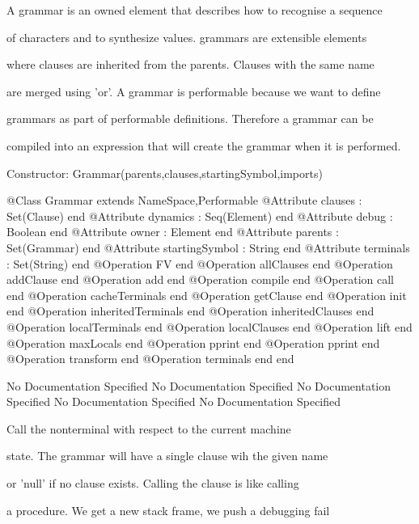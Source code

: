      A grammar is an owned element that describes how to recognise a sequence

     of characters and to synthesize values. grammars are extensible elements

     where clauses are inherited from the parents. Clauses with the same name

     are merged using 'or'. A grammar is performable because we want to define

     grammars as part of performable definitions. Therefore a grammar can be

     compiled into an expression that will create the grammar when it is performed.
     
     Constructor: Grammar(parents,clauses,startingSymbol,imports)
\begin{Interface}
@Class Grammar extends NameSpace,Performable
  @Attribute clauses : Set(Clause) end
  @Attribute dynamics : Seq(Element) end
  @Attribute debug : Boolean end
  @Attribute owner : Element end
  @Attribute parents : Set(Grammar) end
  @Attribute startingSymbol : String end
  @Attribute terminals : Set(String) end
  @Operation FV end
  @Operation allClauses end
  @Operation addClause end
  @Operation add end
  @Operation compile end
  @Operation call end
  @Operation cacheTerminals end
  @Operation getClause end
  @Operation init end
  @Operation inheritedTerminals end
  @Operation inheritedClauses end
  @Operation localTerminals end
  @Operation localClauses end
  @Operation lift end
  @Operation maxLocals end
  @Operation pprint end
  @Operation pprint end
  @Operation transform end
  @Operation terminals end
end
\end{Interface}
No Documentation Specified
No Documentation Specified
No Documentation Specified
No Documentation Specified
No Documentation Specified

          Call the nonterminal with respect to the current machine

          state. The grammar will have a single clause wih the given name

          or 'null' if no clause exists. Calling the clause is like calling

          a procedure. We get a new stack frame, we push a debugging fail

